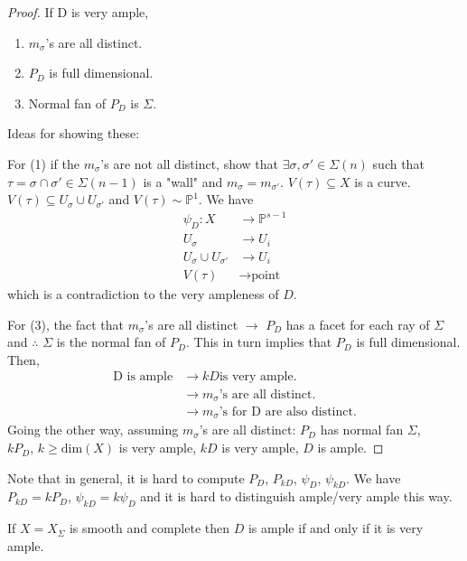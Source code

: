 \documentclass[a4paper,12pt]{amsart}
\begin{document}
\begin{proof}
	If D is very ample,
	\begin{enumerate}
		\item $m_\sigma$'s are all distinct.
		\item $P_D$ is full dimensional.
		\item Normal fan of $P_D$ is $\Sigma$.
	\end{enumerate}
	Ideas for showing these:
	
	For (1) if the $m_\sigma$'s are not all distinct, show that $\exists \sigma, \sigma' \in \Sigma(n)$ such that $\tau = \sigma \cap \sigma' \in \Sigma(n-1)$ is a "wall" and $m_\sigma = m_{\sigma'}$. $V(\tau) \subseteq X$ is a curve. $V(\tau) \subseteq U_\sigma \cup U_{\sigma'}$ and $V(\tau) \sim \mathbb{P}^1$. We have
	\begin{equation}
		\begin{aligned}
		\psi_D: X &\rightarrow \mathbb{P}^{s-1} \\
		U_\sigma &\rightarrow U_i \\
		U_\sigma \cup U_{\sigma'} &\rightarrow U_i \\
		V(\tau) &\rightarrow \text{point}
		\end{aligned}
	\end{equation}
	which is a contradiction to the very ampleness of $D$.
	
	For (3), the fact that $m_\sigma$'s are all distinct $\rightarrow$ $P_D$ has a facet for each ray of $\Sigma$ and $\therefore$ $\Sigma$ is the normal fan of $P_D$. This in turn implies that $P_D$ is full dimensional. Then, 
	\begin{equation}
		\begin{aligned}
		\text{D is ample} &\rightarrow kD \text{is very ample}. \\
		&\rightarrow m_\sigma \text{'s are all distinct.}\\
		&\rightarrow m_\sigma \text{'s for D are also distinct}.	
		\end{aligned}
	\end{equation}
	Going the other way, assuming $m_\sigma$'s are all distinct: $P_D$ has normal fan $\Sigma$, $k P_D, \, k \geq \text{dim}(X)$ is very ample, $kD$ is very ample, $D$ is ample.
\end{proof}
Note that in general, it is hard to compute $P_D$, $P_{kD}$, $\psi_D$, $\psi_{kD}$. We have $P_{kD}=kP_D$, $\psi_{kD}=k\psi_D$ and it is hard to distinguish ample/very ample this way.
\begin{corollary}
	If $X=X_\Sigma$ is smooth and complete then $D$ is ample if and only if it is very ample.
\end{corollary}
\end{document}
